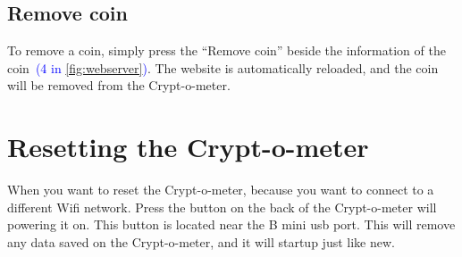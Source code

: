 \documentclass[11pt]{article}
\begin{document}
    \subsection{Remove coin}\label{subsec:remove-coin}
    To remove a coin, simply press the ``Remove coin'' beside the information of the coin~\textcolor{blue}{(4 in \cref{fig:webserver})}.
    The website is automatically reloaded, and the coin will be removed from the Crypt-o-meter.

    \newpage

    \section{Resetting the Crypt-o-meter}\label{sec:resetting-the-crypt-o-meter}
    When you want to reset the Crypt-o-meter, because you want to connect to a different Wifi network.
    Press the button on the back of the Crypt-o-meter will powering it on.
    This button is located near the B mini usb port.
    This will remove any data saved on the Crypt-o-meter, and it will startup just like new.
\end{document}
